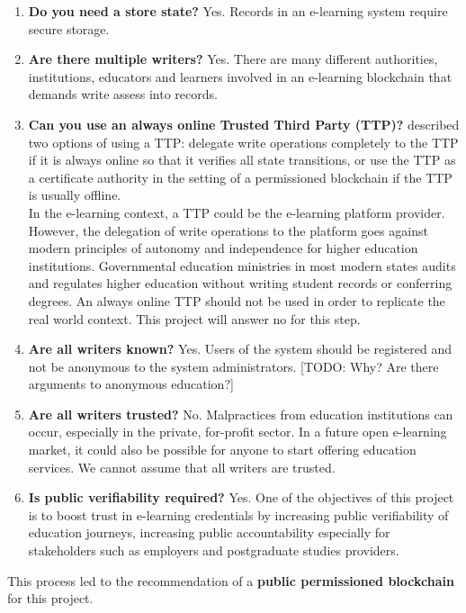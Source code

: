 \begin{enumerate}
    \item \textbf{Do you need a store state?} Yes. Records in an e-learning system require secure storage.
    \item \textbf{Are there multiple writers?} Yes. There are many different authorities, institutions, educators and learners 
    involved in an e-learning blockchain that demands write assess into records.
    \item \textbf{Can you use an always online Trusted Third Party (TTP)?} \citet[p.2]{wust2017you} described two options of 
    using a TTP: delegate write operations completely to the TTP if it is always online so that it verifies all state 
    transitions, or use the TTP as a certificate authority in the setting of a permissioned blockchain if the TTP is usually 
    offline.\\ 
    In the e-learning context, a TTP could be the e-learning platform provider. However, the delegation of write operations 
    to the platform goes against modern principles of autonomy and independence for higher education institutions. 
    Governmental education ministries in most modern states audits and regulates higher education without writing student 
    records or conferring degrees. An always online TTP should not be used in order to replicate the real world context. This 
    project will answer no for this step.
    \item \textbf{Are all writers known?} Yes. Users of the system should be registered and not be anonymous to the system 
    administrators. [TODO: Why? Are there arguments to anonymous education?]
    \item \textbf{Are all writers trusted?} No. Malpractices from education institutions can occur, especially in the private, 
    for-profit sector. In a future open e-learning market, it could also be possible for anyone to start offering education 
    services. We cannot assume that all writers are trusted.
    \item \textbf{Is public verifiability required?} Yes. One of the objectives of this project is to boost trust in e-learning 
    credentials by increasing public verifiability of education journeys, increasing public accountability especially for 
    stakeholders such as employers and postgraduate studies providers.
\end{enumerate}

This process led to the recommendation of a \textbf{public permissioned blockchain} for this project.

